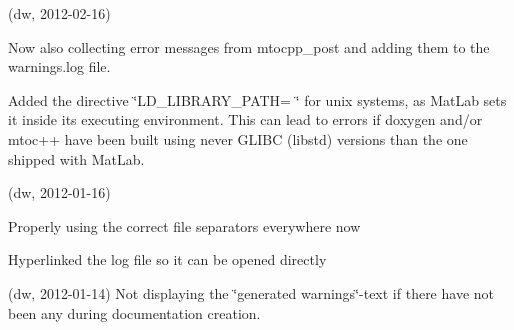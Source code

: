 
\begin{DoxyRefList}
\item[\label{changelog1_3__changelog1_3000001}%
\hypertarget{changelog1_3__changelog1_3000001}{}%
Class \hyperlink{class_matlab_doc_maker}{Matlab\+Doc\+Maker} ](dw, 2012-\/02-\/16)
\begin{DoxyItemize}
\item Now also collecting error messages from mtocpp\+\_\+post and adding them to the warnings.\+log file.
\item Added the directive \char`\"{}\+L\+D\+\_\+\+L\+I\+B\+R\+A\+R\+Y\+\_\+\+P\+A\+T\+H= \char`\"{} for unix systems, as Mat\+Lab sets it inside its executing environment. This can lead to errors if doxygen and/or mtoc++ have been built using never G\+L\+I\+BC (libstd) versions than the one shipped with Mat\+Lab.
\end{DoxyItemize}

(dw, 2012-\/01-\/16)
\begin{DoxyItemize}
\item Properly using the correct file separators everywhere now
\item Hyperlinked the log file so it can be opened directly
\end{DoxyItemize}

(dw, 2012-\/01-\/14) Not displaying the \char`\"{}generated warnings\char`\"{}-\/text if there have not been any during documentation creation.
\end{DoxyRefList}